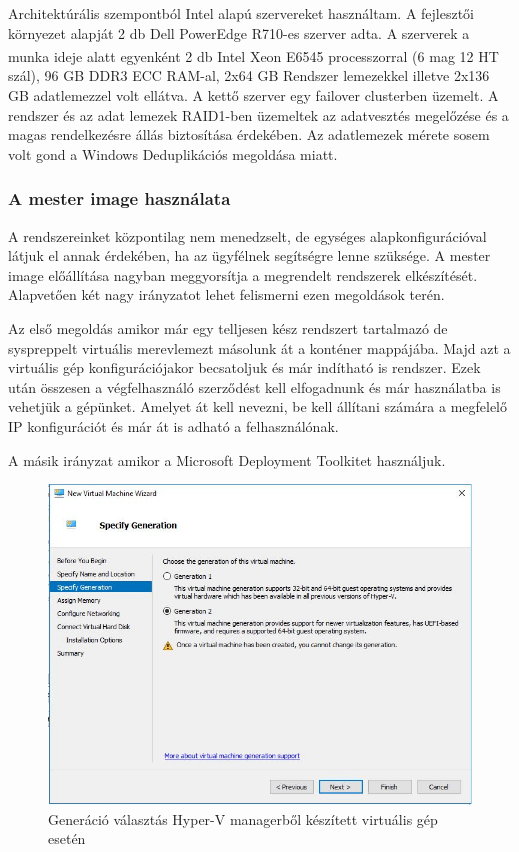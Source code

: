 \documentclass[12pt,oneside,justify]{book}
\begin{document}
\noindent Architektúrális szempontból Intel alapú szervereket használtam. A fejlesztői környezet alapját 2 db Dell PowerEdge R710-es szerver adta. A szerverek 
a munka ideje alatt egyenként 2 db Intel{\textsuperscript{\textregistered}} Xeon{\textsuperscript{\textregistered}} E6545 processzorral (6 mag 12 HT szál), 96 GB DDR3 ECC RAM-al, 2x64 GB Rendszer lemezekkel illetve 2x136 GB adatlemezzel volt ellátva. A kettő szerver egy failover clusterben üzemelt. A rendszer és az adat lemezek RAID1-ben üzemeltek az adatvesztés megelőzése és a magas rendelkezésre állás biztosítása érdekében. Az adatlemezek mérete sosem volt gond a Windows Deduplikációs megoldása miatt.

\subsubsection{A mester image használata}

\noindent A rendszereinket központilag nem menedzselt, de egységes alapkonfigurációval látjuk el annak érdekében, ha az ügyfélnek segítségre lenne szüksége. A mester image előállítása nagyban meggyorsítja a megrendelt rendszerek elkészítését. Alapvetően két nagy irányzatot lehet felismerni ezen megoldások terén. 

Az első megoldás amikor már egy telljesen kész rendszert tartalmazó de syspreppelt virtuális merevlemezt másolunk át a konténer mappájába. Majd azt a virtuális gép konfigurációjakor becsatoljuk és már indítható is rendszer. Ezek után összesen a végfelhasználó szerződést kell elfogadnunk és már használatba is vehetjük a gépünket. Amelyet át kell nevezni, be kell állítani számára a megfelelő IP konfigurációt és már át is adható a felhasználónak. 

A másik irányzat amikor a Microsoft Deployment Toolkitet használjuk. 
\begin{figure}[h]
\includegraphics[width=\textwidth]{generation_selection}
\caption{Generáció választás Hyper-V managerből készített virtuális gép esetén}
\label{fig:gen_selection}
\end{figure}
\end{document}
